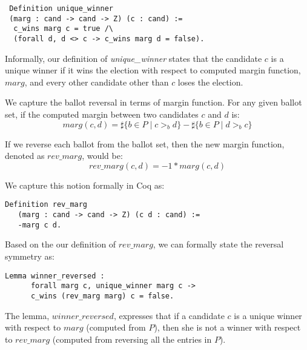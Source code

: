  \begin{verbatim}
 Definition unique_winner 
 (marg : cand -> cand -> Z) (c : cand) :=
  c_wins marg c = true /\
  (forall d, d <> c -> c_wins marg d = false).
\end{verbatim}  

Informally, our definition of \textit{unique\_winner} states that the candidate $c$ is a unique winner
if it wins the election with respect to computed margin function, $marg$, and every other candidate 
other than $c$ loses the election. 

We capture the ballot reversal in terms of margin function. For any given ballot set, if the computed 
margin between two candidates $c$ and $d$ is: 
\[
  marg(c, d) = \sharp \lbrace b \in P \mid c >_b d \rbrace -
            \sharp \lbrace b \in P \mid d >_b c \rbrace
\] 

If we reverse each ballot from the ballot set, then the new margin function, denoted as $rev\_marg$, would be:
\[
  rev\_marg(c, d) = -1 * marg (c, d)
\] 

We capture this notion formally in Coq as:

\begin{verbatim}
Definition rev_marg 
   (marg : cand -> cand -> Z) (c d : cand) :=
   -marg c d.
\end{verbatim}

Based on the our definition of $rev\_marg$, we can formally state the reversal symmetry as:
\begin{verbatim}
Lemma winner_reversed :
      forall marg c, unique_winner marg c ->
      c_wins (rev_marg marg) c = false.
\end{verbatim}

The lemma, $winner\_reversed$, expresses that if a candidate $c$ is a unique winner 
with respect to $marg$ (computed from $P$), then she is not a winner with respect 
to $rev\_marg$ (computed from reversing all the entries in $P$).



